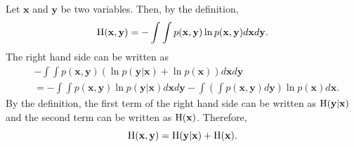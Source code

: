 \subsection{}
\label{1.37}
Let $\mathbf{x}$ and $\mathbf{y}$ be two variables.
Then, by the definition, 
%
\begin{equation}
{\rm H}(\mathbf{x}, \mathbf{y}) 
= 
- 
\int 
\int 
p(\mathbf{x}, \mathbf{y}) 
\ln p(\mathbf{x}, \mathbf{y}) 
d\mathbf{x} 
d\mathbf{y}.
\end{equation}
%
The right hand side can be written as
%
\begin{equation}
\begin{aligned}
&
- 
\int 
\int 
p(\mathbf{x}, \mathbf{y}) 
\left( 
	\ln p(\mathbf{y} | \mathbf{x}) 
	+ 
	\ln p(\mathbf{x}) 
\right) 
d\mathbf{x} 
d\mathbf{y} \\
&= 
- 
\int 
\int 
p(\mathbf{x}, \mathbf{y}) 
\ln p(\mathbf{y} | \mathbf{x})
d\mathbf{x} 
d\mathbf{y} 
- 
\int 
\left( 
	\int p(\mathbf{x}, \mathbf{y}) 
	d\mathbf{y} 
\right) 
\ln p(\mathbf{x}) 
d\mathbf{x}.
\end{aligned}
\end{equation}
%
By the definition, the first term of the right hand side can be written as ${\rm H}(\mathbf{y} | \mathbf{x})$ and the second term can be written as ${\rm H}(\mathbf{x})$.
Therefore,
%
\begin{equation}
{\rm H}(\mathbf{x}, \mathbf{y}) 
= 
{\rm H}(\mathbf{y} | \mathbf{x}) 
+ 
{\rm H}(\mathbf{x}).
\end{equation}
%


